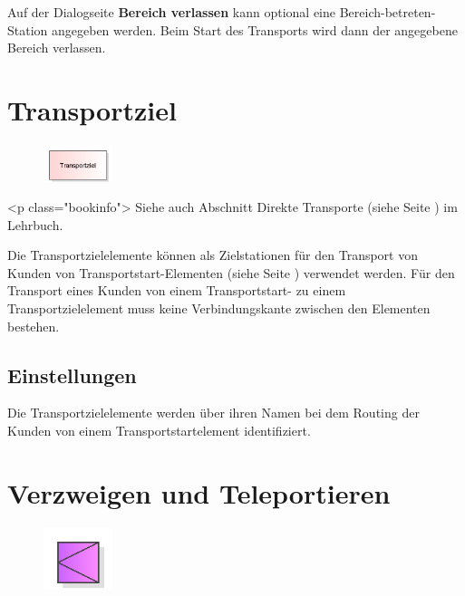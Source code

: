 Auf der Dialogseite \textbf{Bereich verlassen} kann optional eine
Bereich-betreten-Station angegeben werden. Beim Start des Transports
wird dann der angegebene Bereich verlassen.


\section{Transportziel}
\label{ref:ModelElementTransportDestination}

\begin{figure}
\vspace{-22pt}
\includegraphics[width=2cm]{imageModelElementTransportDestination.png}
\vspace{-22pt}
\end{figure}

<p class="bookinfo">
Siehe auch Abschnitt Direkte Transporte (siehe Seite \pageref{ref:book:8.3.1}) im Lehrbuch.

Die Transportzielelemente können als Zielstationen für den Transport von Kunden von
Transportstart-Elementen (siehe Seite \pageref{ref:ModelElementTransportSource}) verwendet werden.
Für den Transport eines Kunden von einem Transportstart- zu einem Transportzielelement
muss keine Verbindungskante zwischen den Elementen bestehen.

\subsection*{Einstellungen}

Die Transportzielelemente werden über ihren Namen bei dem Routing der Kunden von
einem Transportstartelement identifiziert.


\section{Verzweigen und Teleportieren}
\label{ref:ModelElementDecideAndTeleport}

\begin{figure}
\vspace{-22pt}
\includegraphics[width=2cm]{imageModelElementDecideAndTeleport.png}
\vspace{-22pt}
\end{figure}


